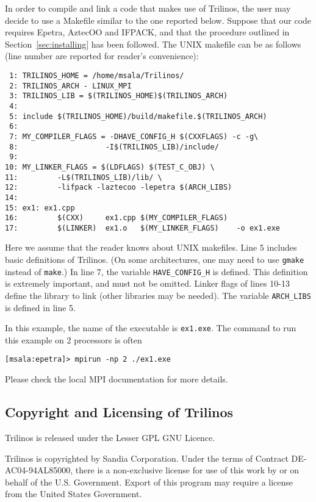 In order to compile and link a code that makes use of Trilinos, the user
may decide to use a Makefile similar to the one reported below.  Suppose
that our code requires Epetra, AztecOO and IFPACK, and that the
procedure outlined in Section~\ref{sec:installing} has been followed.
The UNIX makefile can be as follows (line number are reported for
reader's convenience):
\begin{verbatim}
 1: TRILINOS_HOME = /home/msala/Trilinos/
 2: TRILINOS_ARCH - LINUX_MPI
 3: TRILINOS_LIB = $(TRILINOS_HOME)$(TRILINOS_ARCH)
 4: 
 5: include $(TRILINOS_HOME)/build/makefile.$(TRILINOS_ARCH)
 6: 
 7: MY_COMPILER_FLAGS = -DHAVE_CONFIG_H $(CXXFLAGS) -c -g\
 8:                    -I$(TRILINOS_LIB)/include/
 9:
10: MY_LINKER_FLAGS = $(LDFLAGS) $(TEST_C_OBJ) \
11:         -L$(TRILINOS_LIB)/lib/ \
12:         -lifpack -laztecoo -lepetra $(ARCH_LIBS)
14:
15: ex1: ex1.cpp
16:         $(CXX)     ex1.cpp $(MY_COMPILER_FLAGS)
17:         $(LINKER)  ex1.o   $(MY_LINKER_FLAGS)    -o ex1.exe
\end{verbatim}
Here we assume that the reader knows about UNIX makefiles.  Line 5
includes basic definitions of Trilinos. (On some architectures, one may
need to use \verb!gmake! instead of \verb!make!.)  In line 7, the
variable \verb!HAVE_CONFIG_H! is defined.  This definition is extremely
important, and must not be omitted.  Linker flags of lines 10-13 define
the library to link (other libraries may be needed).  The variable
\verb!ARCH_LIBS! is defined in line 5.

In this example, the name of the executable is \verb!ex1.exe!.  The
command to run this example on 2 processors is often
\begin{verbatim}
[msala:epetra]> mpirun -np 2 ./ex1.exe
\end{verbatim}
Please check the local MPI documentation for more details. 


\subsection{Copyright and Licensing of Trilinos}
\label{sec:copyright}

Trilinos is released under the Lesser GPL GNU Licence.

Trilinos is copyrighted by Sandia Corporation. Under the terms of
Contract DE-AC04-94AL85000, there is a non-exclusive license for use of
this work by or on behalf of the U.S. Government.  Export of this
program may require a license from the United States Government.

